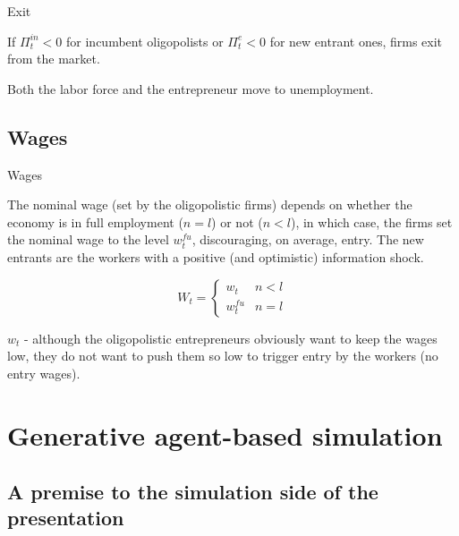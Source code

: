\documentclass[9pt]{beamer}
\begin{document}
\begin{frame}{Exit}

If $\Pi _t^{in} < 0$ for incumbent oligopolists or $\Pi_t^{e} < 0 $ for new entrant ones, firms exit from the market.

\bigskip

Both the labor force and the entrepreneur move to unemployment.

\end{frame}

\subsection{Wages}

\begin{frame}{Wages}

The nominal wage (set by the oligopolistic firms) depends on whether the economy is in full employment ($n=l$) or not ($n<l$), in which case, the firms set the nominal wage to the level $w_{t}^{fu}$, discouraging, on average, entry. The new entrants are the workers with a positive (and optimistic) information shock.

\begin{equation}
W_{t}=
\begin{cases}
w_{t} & n<l \\
w_{t}^{fu} & n=l
\end{cases}
\label{wage general determination}
\end{equation}

$w_{t}$ -  although the oligopolistic entrepreneurs obviously want to keep the
wages low, they do not want to push them so low to trigger entry by the workers (no entry wages).

\end{frame}

\section{Generative agent-based simulation}

\subsection{A premise to the simulation side of the presentation}
\end{document}
